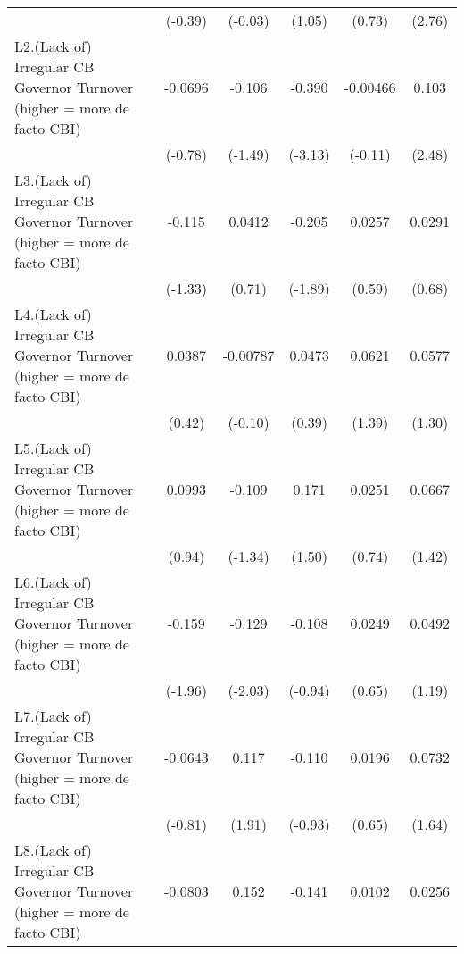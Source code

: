 {\begin{longtable}{l*{5}{c}}
                &  (-0.39)         &  (-0.03)         &   (1.05)         &   (0.73)         &   (2.76)         \\
\addlinespace
L2.(Lack of) Irregular CB Governor Turnover (higher = more de facto CBI)&  -0.0696         &   -0.106         &   -0.390\sym{**} & -0.00466         &    0.103\sym{*}  \\
                &  (-0.78)         &  (-1.49)         &  (-3.13)         &  (-0.11)         &   (2.48)         \\
\addlinespace
L3.(Lack of) Irregular CB Governor Turnover (higher = more de facto CBI)&   -0.115         &   0.0412         &   -0.205         &   0.0257         &   0.0291         \\
                &  (-1.33)         &   (0.71)         &  (-1.89)         &   (0.59)         &   (0.68)         \\
\addlinespace
L4.(Lack of) Irregular CB Governor Turnover (higher = more de facto CBI)&   0.0387         & -0.00787         &   0.0473         &   0.0621         &   0.0577         \\
                &   (0.42)         &  (-0.10)         &   (0.39)         &   (1.39)         &   (1.30)         \\
\addlinespace
L5.(Lack of) Irregular CB Governor Turnover (higher = more de facto CBI)&   0.0993         &   -0.109         &    0.171         &   0.0251         &   0.0667         \\
                &   (0.94)         &  (-1.34)         &   (1.50)         &   (0.74)         &   (1.42)         \\
\addlinespace
L6.(Lack of) Irregular CB Governor Turnover (higher = more de facto CBI)&   -0.159         &   -0.129\sym{*}  &   -0.108         &   0.0249         &   0.0492         \\
                &  (-1.96)         &  (-2.03)         &  (-0.94)         &   (0.65)         &   (1.19)         \\
\addlinespace
L7.(Lack of) Irregular CB Governor Turnover (higher = more de facto CBI)&  -0.0643         &    0.117         &   -0.110         &   0.0196         &   0.0732         \\
                &  (-0.81)         &   (1.91)         &  (-0.93)         &   (0.65)         &   (1.64)         \\
\addlinespace
L8.(Lack of) Irregular CB Governor Turnover (higher = more de facto CBI)&  -0.0803         &    0.152\sym{*}  &   -0.141         &   0.0102         &   0.0256         \\

\end{longtable}}
